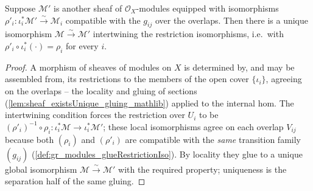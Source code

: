 \begin{lemma}
  \label{lem:gr_modules_glue_unique}
  Suppose \(\mathcal{M}'\) is another sheaf of \(\mathcal{O}_X\)-modules equipped with
  isomorphisms \(\rho'_i : \iota_i^{*}\mathcal{M}' \xrightarrow{\sim} \mathcal{M}_i\)
  compatible with the \(g_{ij}\) over the overlaps. Then there is a unique isomorphism
  \(\mathcal{M} \xrightarrow{\sim} \mathcal{M}'\) intertwining the restriction
  isomorphisms, i.e.\ with \(\rho'_i \circ \iota_i^{*}(\cdot) = \rho_i\) for every \(i\).
\end{lemma}
\begin{proof}
  A morphism of sheaves of modules on \(X\) is determined by, and may be assembled from,
  its restrictions to the members of the open cover \(\{\iota_i\}\), agreeing on the
  overlaps -- the locality and gluing of sections
  (\cref{lem:sheaf_existsUnique_gluing_mathlib}) applied to the internal hom. The
  intertwining condition forces the restriction over \(U_i\) to be
  \((\rho'_i)^{-1} \circ \rho_i : \iota_i^{*}\mathcal{M} \to \iota_i^{*}\mathcal{M}'\);
  these local isomorphisms agree on each overlap \(V_{ij}\) because both
  \((\rho_i)\) and \((\rho'_i)\) are compatible with the \emph{same} transition family
  \((g_{ij})\) (\cref{def:gr_modules_glueRestrictionIso}). By locality they glue to a
  unique global isomorphism \(\mathcal{M} \xrightarrow{\sim} \mathcal{M}'\) with the
  required property; uniqueness is the separation half of the same gluing.
\end{proof}

